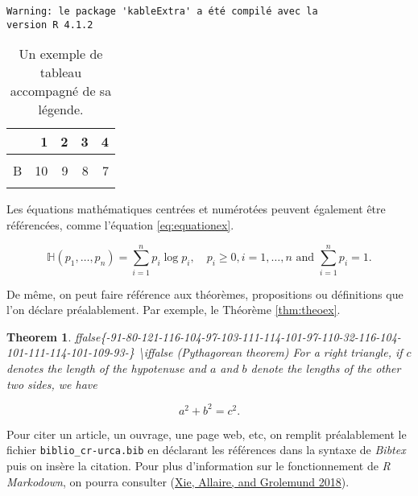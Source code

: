 \documentclass[french,]{compterendu}
\newtheorem{theorem}{Theorem}[section]
\theoremstyle{definition}
\theoremstyle{definition}
\theoremstyle{definition}
\theoremstyle{definition}
\theoremstyle{remark}
\begin{document}
\begin{verbatim}
Warning: le package 'kableExtra' a été compilé avec la
version R 4.1.2
\end{verbatim}

\begin{table}

\caption{\label{tab:tableex}Un exemple de tableau accompagné de sa légende.}
\centering
\begin{tabular}[t]{lrrrr}
\toprule
\textbf{ } & \textbf{1} & \textbf{2} & \textbf{3} & \textbf{4}\\
\midrule
\cellcolor{gray!6}{A} & \cellcolor{gray!6}{7} & \cellcolor{gray!6}{10} & \cellcolor{gray!6}{5} & \cellcolor{gray!6}{13}\\
B & 10 & 9 & 8 & 7\\
\cellcolor{gray!6}{C} & \cellcolor{gray!6}{12} & \cellcolor{gray!6}{8} & \cellcolor{gray!6}{3} & \cellcolor{gray!6}{8}\\
\bottomrule
\end{tabular}
\end{table}

Les équations mathématiques centrées et numérotées peuvent également être référencées, comme l'équation \eqref{eq:equationex}.

\begin{equation}
 \mathbb{H}(p_1, \dots, p_n) = \sum_{i=1}^n p_i \log p_i, \quad p_i \geq 0, i = 1, \dots, n \textrm{ and }  \sum_{i=1}^n p_i =1.
 \label{eq:equationex}
\end{equation}

De même, on peut faire référence aux théorèmes, propositions ou définitions que l'on déclare préalablement. Par exemple, le Théorème \ref{thm:theoex}.

\begin{theorem}{}
ffalse\{-91-80-121-116-104-97-103-111-114-101-97-110-32-116-104-101-111-114-101-109-93-\}\fi{}
\protect\hypertarget{thm:theoex}{}{\label{thm:theoex} \textbackslash iffalse (Pythagorean theorem) \fi{} }For a right triangle, if \(c\) denotes the length of the hypotenuse
and \(a\) and \(b\) denote the lengths of the other two sides, we have

\[a^2 + b^2 = c^2.\]
\end{theorem}

Pour citer un article, un ouvrage, une page web, etc, on remplit préalablement le fichier \texttt{biblio\_cr-urca.bib} en déclarant les références dans la syntaxe de \emph{Bibtex} puis on insère la citation. Pour plus d'information sur le fonctionnement de \emph{R Markodown}, on pourra consulter (\protect\hyperlink{ref-rmarkdown_refbook2018}{Xie, Allaire, and Grolemund 2018}).
\end{document}
